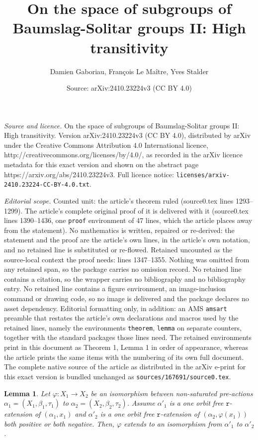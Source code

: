 \documentclass[10pt,a4paper]{amsart}
\title{On the space of subgroups of Baumslag-Solitar groups II: High transitivity}
\author{Damien Gaboriau, Fran\c{c}ois Le Ma\^itre, Yves Stalder}
\date{Source: arXiv:2410.23224v3 (CC BY 4.0)}
\newtheorem{lemma}{Lemma}
\newcommand{\trrule}{\mathtt{r}}
\begin{document}
\maketitle

\noindent\emph{Source and licence.} On the space of subgroups of Baumslag-Solitar groups II: High transitivity. Version arXiv:2410.23224v3 (CC BY 4.0), distributed by arXiv under the Creative Commons Attribution 4.0 International licence, http://creativecommons.org/licenses/by/4.0/, as recorded in the arXiv licence metadata for this exact version and shown on the abstract page https://arxiv.org/abs/2410.23224v3. Full licence notice: \texttt{licenses/arxiv-2410.23224-CC-BY-4.0.txt}.\par\smallskip

\noindent\textit{Editorial scope.} Counted unit: the article's theorem ruled (source0.tex lines 1293--1299). The article's complete original proof of it is delivered with it (source0.tex lines 1390--1436, one \texttt{proof} environment of 47 lines, which the article places away from the statement). No mathematics is written, repaired or re-derived: the statement and the proof are the article's own lines, in the article's own notation, and no retained line is substituted or re-flowed.  Retained uncounted as the source-local context the proof needs: lines 1347--1355.  Nothing was omitted from any retained span, so the package carries no omission record.  No retained line contains a citation, so the wrapper carries no bibliography and no bibliography entry.  No retained line contains a figure environment, an image-inclusion command or drawing code, so no image is delivered and the package declares no asset dependency.  Editorial formatting only, in addition: an AMS \texttt{amsart} preamble that restates the article's own declarations and macros used by the retained lines, namely the environments \texttt{theorem}, \texttt{lemma} on separate counters, together with the standard packages those lines need.  The retained environments print in this document as Theorem 1, Lemma 1 in order of appearance, whereas the article prints the same items with the numbering of its own full document.  The complete native source of the article as distributed in the arXiv e-print for this exact version is bundled unchanged as \texttt{sources/167691/source0.tex}.
	\begin{lemma}
		\label{lem: isomorphisms and one orbit extensions}
		Let $\varphi: X_1 \to X_2$ be an isomorphism between 
		non-saturated pre-actions $\alpha_1 = (X_1,\beta_1, \tau_1)$ to $\alpha_2 = (X_2,\beta_2, \tau_2)$.
		Assume $\alpha'_1$ is a one orbit free \( \trrule \)-extension of $(\alpha_1,x_1)$ and
		$\alpha'_2$ is a one orbit free \( \trrule \)-extension of $(\alpha_2,\varphi(x_1))$
		both positive or both negative.
		Then, $\varphi$ extends to an isomorphism from $\alpha'_1$ to $\alpha'_2$.
	\end{lemma}
\end{document}
